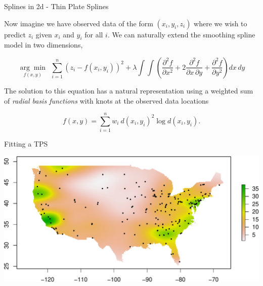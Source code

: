 \documentclass[11pt,ignorenonframetext,]{beamer}
\newenvironment{Shaded}{}{}
\newcommand{\KeywordTok}[1]{\textcolor[rgb]{0.00,0.44,0.13}{\textbf{#1}}}
\newcommand{\DataTypeTok}[1]{\textcolor[rgb]{0.56,0.13,0.00}{#1}}
\newcommand{\DecValTok}[1]{\textcolor[rgb]{0.25,0.63,0.44}{#1}}
\newcommand{\FloatTok}[1]{\textcolor[rgb]{0.25,0.63,0.44}{#1}}
\newcommand{\StringTok}[1]{\textcolor[rgb]{0.25,0.44,0.63}{#1}}
\newcommand{\OperatorTok}[1]{\textcolor[rgb]{0.40,0.40,0.40}{#1}}
\newcommand{\NormalTok}[1]{#1}
\let\oldShaded\Shaded
\let\endoldShaded\endShaded
\renewenvironment{Shaded}{\footnotesize\begin{spacing}{0.9}\oldShaded}{\endoldShaded\end{spacing}}
\let\oldverbatim\verbatim
\let\endoldverbatim\endverbatim
\newcommand{\scriptoutput}{
  \renewenvironment{Shaded}{\scriptsize\begin{spacing}{0.9}\oldShaded}{\endoldShaded\end{spacing}}
  \renewenvironment{verbatim}{\scriptsize\begin{spacing}{0.9}\oldverbatim}{\endoldverbatim\end{spacing}}
}
\begin{document}
\begin{frame}{Splines in 2d - Thin Plate Splines}

Now imagine we have observed data of the form \((x_i, y_i, z_i)\) where
we wish to predict \(z_i\) given \(x_i\) and \(y_i\) for all \(i\). We
can naturally extend the smoothing spline model in two dimensions,

\[ \underset{f(x,y)}{\arg\min} ~~ \sum_{i=1}^n (z_i-f(x_i,y_i))^2 + \lambda \int \int \left(\frac{\partial^2 f}{\partial x^2} + 2 \frac{\partial^2 f}{\partial x \, \partial y} + \frac{\partial^2 f}{\partial y^2} \right) dx\, dy\]

The solution to this equation has a natural representation using a
weighted sum of \emph{radial basis functions} with knots at the observed
data locations

\[ f(x,y) = \sum_{i=1}^n w_i ~ d(x_i,y_i)^2 \log d(x_i,y_i).  \]

\end{frame}

\begin{frame}[fragile,t]{Fitting a TPS}

\scriptoutput

\begin{Shaded}
\end{Shaded}

\includegraphics{Lec20_files/figure-beamer/unnamed-chunk-15-1.pdf}

\end{frame}
\end{document}

